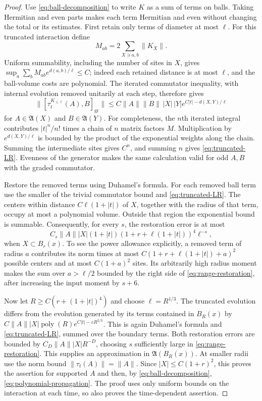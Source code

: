 \begin{proof}
Use \eqref{eq:ball-decomposition} to write $K$ as a sum of terms on
balls.  Taking Hermitian and even parts makes each term Hermitian
and even without changing the total or its estimates.  First retain
only terms of diameter at most $\ell$.  For
this truncated interaction define
\[
 M_{ab}=2\sum_{X\ni a,b}\|K_X\|.
\]
Uniform summability, including the number of sites in $X$, gives
$\sup_a\sum_b M_{ab}e^{d(a,b)/\ell}\leq C$; indeed each retained
distance is at most $\ell$, and the ball-volume costs are polynomial.
The iterated commutator inequality, with internal evolution removed
unitarily at each step, therefore gives
\begin{equation}
 \|[\tau_t^{K_{\leq\ell}}(A),B]_{\mathrm{gr}}\|
 \leq C\|A\|\|B\|\,|X|\,|Y|
        e^{C|t|-d(X,Y)/\ell}
 \label{eq:truncated-LR}
\end{equation}
for $A\in\mathfrak A(X)$ and $B\in\mathfrak A(Y)$.
For completeness, the $n$th iterated integral contributes $|t|^n/n!$
times a chain of $n$ matrix factors $M$.  Multiplication by
$e^{d(X,Y)/\ell}$ is bounded by the product of the exponential
weights along the chain.  Summing the intermediate sites gives
$C^n$, and summing $n$ gives \eqref{eq:truncated-LR}.  Evenness of
the generator makes the same calculation valid for odd $A,B$ with
the graded commutator.

Restore the removed terms using Duhamel's formula.  For each removed
ball term use the smaller of the trivial commutator bound and
\eqref{eq:truncated-LR}.  The centers within distance
$C\ell(1+|t|)$ of $X$, together with the radius of that term, occupy
at most a polynomial volume.  Outside that region the exponential
bound is summable.  Consequently, for every $s$, the restoration
error is at most
\begin{equation}
 C_s\|A\||X|(1+|t|)
       (1+r+\ell(1+|t|))^4\ell^{-s},
 \label{eq:range-restoration}
\end{equation}
when $X\subset B_r(x)$.  To see the power allowance explicitly, a
removed term of radius $a$ contributes its norm times at most
$C(1+r+\ell(1+|t|)+a)^2$ possible centers and at most
$C(1+a)^2$ sites.  Its arbitrarily high radius moment makes the sum
over $a>\ell/2$ bounded by the right side of
\eqref{eq:range-restoration}, after increasing the input moment by
$s+6$.

Now let $R\geq C(r+(1+|t|)^4)$ and choose $\ell=R^{1/3}$.
The truncated evolution differs from the evolution generated by its
terms contained in $B_R(x)$ by
$C\|A\||X|\operatorname{poly}(R)e^{C|t|-cR^{2/3}}$.
This is again Duhamel's formula and \eqref{eq:truncated-LR}, summed
over the boundary terms.  Both restoration errors are bounded by
$C_D\|A\||X|R^{-D}$, choosing $s$ sufficiently large in
\eqref{eq:range-restoration}.  This supplies an approximation in
$\mathfrak A(B_R(x))$.  At smaller radii use the norm bound
$\|\tau_t(A)\|=\|A\|$.  Since $|X|\leq C(1+r)^2$, this proves the
assertion for supported $A$ and then, by
\eqref{eq:ball-decomposition}, \eqref{eq:polynomial-propagation}.
The proof uses only uniform bounds on the interaction at each time,
so also proves the time-dependent assertion.
\end{proof}

